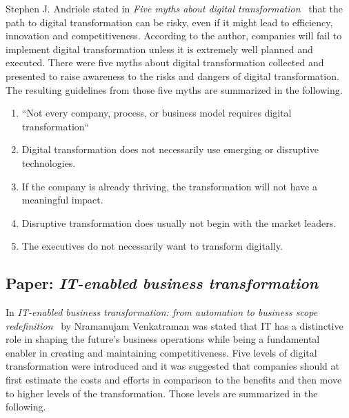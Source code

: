 \documentclass[a4]{scrartcl}
\begin{document}
	Stephen J. Andriole stated in \textit{Five myths about digital transformation}~\cite{5myths} that the path to digital transformation can be risky, even if it might lead to efficiency, innovation and competitiveness.
	According to the author, companies will fail to implement digital transformation unless it is extremely well planned and executed. There were five myths about digital transformation collected and presented to raise awareness to the risks and dangers of digital transformation. The resulting guidelines from those five myths are summarized in the following.~\cite{5myths}
	\begin{enumerate}
		\item ``Not every company, process, or business model requires digital transformation``~\cite[p. 20]{5myths}
		\item Digital transformation does not necessarily use emerging or disruptive technologies.
		\item If the company is already thriving, the transformation will not have a meaningful impact.
		\item Disruptive transformation does usually not begin with the market leaders.
		\item The executives do not necessarily want to transform digitally.
	\end{enumerate}
	
	










\subsection{Paper: \textit{IT-enabled business transformation}} \label{venkat}	

In \textit{IT-enabled business transformation: from automation to business scope redefinition}~\cite{venkat} by Nramanujam Venkatraman was stated that IT has a distinctive role in shaping the future's business operations while being a fundamental enabler in creating and maintaining competitiveness.
Five levels of digital transformation were introduced and it was suggested that companies should at first estimate the costs and efforts in comparison to the benefits and then move to higher levels of the transformation. Those levels are summarized in the following.~\cite{venkat}
\end{document}
